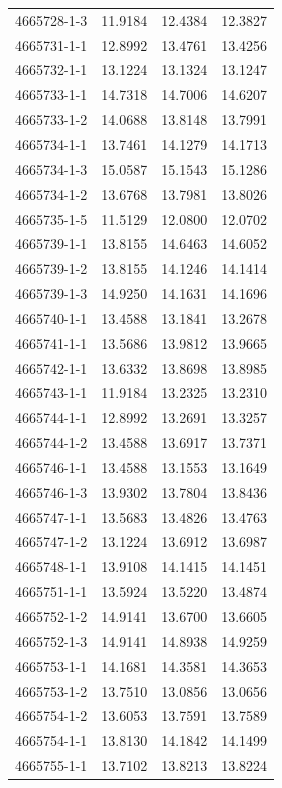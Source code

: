 \begin{longtable}{lrrr}
4665728-1-3 & 11.9184 & 12.4384 & 12.3827 \\
4665731-1-1 & 12.8992 & 13.4761 & 13.4256 \\
4665732-1-1 & 13.1224 & 13.1324 & 13.1247 \\
4665733-1-1 & 14.7318 & 14.7006 & 14.6207 \\
4665733-1-2 & 14.0688 & 13.8148 & 13.7991 \\
4665734-1-1 & 13.7461 & 14.1279 & 14.1713 \\
4665734-1-3 & 15.0587 & 15.1543 & 15.1286 \\
4665734-1-2 & 13.6768 & 13.7981 & 13.8026 \\
4665735-1-5 & 11.5129 & 12.0800 & 12.0702 \\
4665739-1-1 & 13.8155 & 14.6463 & 14.6052 \\
4665739-1-2 & 13.8155 & 14.1246 & 14.1414 \\
4665739-1-3 & 14.9250 & 14.1631 & 14.1696 \\
4665740-1-1 & 13.4588 & 13.1841 & 13.2678 \\
4665741-1-1 & 13.5686 & 13.9812 & 13.9665 \\
4665742-1-1 & 13.6332 & 13.8698 & 13.8985 \\
4665743-1-1 & 11.9184 & 13.2325 & 13.2310 \\
4665744-1-1 & 12.8992 & 13.2691 & 13.3257 \\
4665744-1-2 & 13.4588 & 13.6917 & 13.7371 \\
4665746-1-1 & 13.4588 & 13.1553 & 13.1649 \\
4665746-1-3 & 13.9302 & 13.7804 & 13.8436 \\
4665747-1-1 & 13.5683 & 13.4826 & 13.4763 \\
4665747-1-2 & 13.1224 & 13.6912 & 13.6987 \\
4665748-1-1 & 13.9108 & 14.1415 & 14.1451 \\
4665751-1-1 & 13.5924 & 13.5220 & 13.4874 \\
4665752-1-2 & 14.9141 & 13.6700 & 13.6605 \\
4665752-1-3 & 14.9141 & 14.8938 & 14.9259 \\
4665753-1-1 & 14.1681 & 14.3581 & 14.3653 \\
4665753-1-2 & 13.7510 & 13.0856 & 13.0656 \\
4665754-1-2 & 13.6053 & 13.7591 & 13.7589 \\
4665754-1-1 & 13.8130 & 14.1842 & 14.1499 \\
4665755-1-1 & 13.7102 & 13.8213 & 13.8224 \\

\end{longtable}
